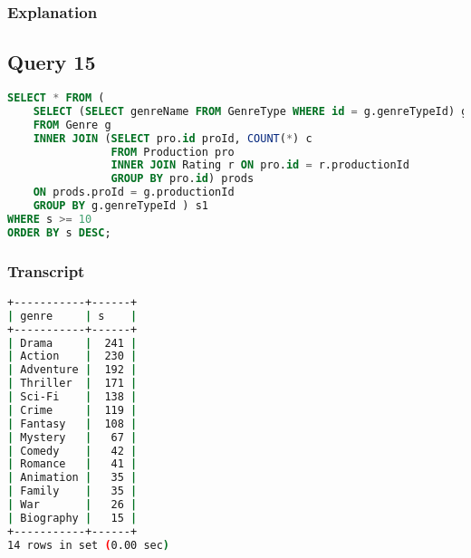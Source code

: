 \subsubsection{Explanation}


\subsection{Query 15}
\begin{lstlisting}[language=sql]
SELECT * FROM (
	SELECT (SELECT genreName FROM GenreType WHERE id = g.genreTypeId) genre, SUM(prods.c) s
	FROM Genre g
	INNER JOIN (SELECT pro.id proId, COUNT(*) c
				FROM Production pro
				INNER JOIN Rating r ON pro.id = r.productionId
				GROUP BY pro.id) prods
	ON prods.proId = g.productionId
	GROUP BY g.genreTypeId ) s1
WHERE s >= 10
ORDER BY s DESC;
\end{lstlisting}

\subsubsection{Transcript}
\begin{lstlisting}[language=bash]
+-----------+------+
| genre     | s    |
+-----------+------+
| Drama     |  241 |
| Action    |  230 |
| Adventure |  192 |
| Thriller  |  171 |
| Sci-Fi    |  138 |
| Crime     |  119 |
| Fantasy   |  108 |
| Mystery   |   67 |
| Comedy    |   42 |
| Romance   |   41 |
| Animation |   35 |
| Family    |   35 |
| War       |   26 |
| Biography |   15 |
+-----------+------+
14 rows in set (0.00 sec)
\end{lstlisting}

